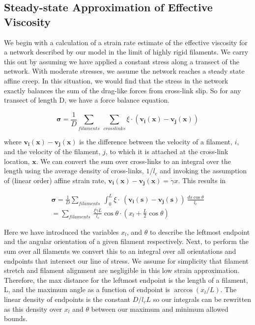 \documentclass[pre,preprint]{revtex4-1}
\begin{document}
\subsection{Steady-state Approximation of Effective Viscosity}
\label{sec:eff_vic}
We begin with a calculation of a strain rate estimate of the effective viscosity for a network described by our model in the limit of highly rigid filaments.  We carry this out by assuming we have applied a constant stress along a transect of the network.  With moderate stresses, we assume the network reaches a steady state affine creep. In this situation, we would find that the stress in the network exactly balances the sum of the drag-like forces from cross-link slip.  So for any transect of length D, we have a force balance equation.

\begin{equation}
\mathbf{\sigma} = \frac{1}{D}\sum_{filaments}\: \sum_{crosslinks}\xi \cdot (\mathbf{v_i(x)}-\mathbf{v_j(x)})
\end{equation}

where $\mathbf{v_i(x)}-\mathbf{v_j(x)}$ is the difference between the velocity of a filament, $i$, and the velocity of the filament, $j$, to which it is attached at the cross-link location, $\mathbf{x}$. We can convert the sum over cross-links to an integral over the length using the average density of cross-links, $1/l_c$ and invoking the assumption of (linear order) affine strain rate, $\mathbf{v_i(x)}-\mathbf{v_j(x)}=\dot \gamma x$. This results in

\begin{multline}
\mathbf{\sigma} =  \frac{1}{D}\sum_{filaments}\:  \int_0^L \xi \cdot  \: (\mathbf{v_i(s)}-\mathbf{v_j(s)}) \:\frac{ds \cos \theta }{l_c} \\
 = \sum_{filaments}\:  \frac{\xi \dot \gamma L}{l_c} \cos \theta \cdot (x_l + \frac{L}{2} \cos \theta)
\end{multline}

Here we have introduced the variables $x_l$, and $\theta$ to describe the leftmost endpoint and the angular orientation of a given filament respectively.  Next, to perform the sum over all filaments we convert this to an integral over all orientations and endpoints that intersect our line of stress. We assume for simplicity that filament stretch and filament alignment are negligible in this low strain approximation.  Therefore, the max distance for the leftmost endpoint is the length of a filament, L, and the maximum angle as a function of endpoint is $\arccos(x_l/L)$.  The linear density of endpoints is the constant $D/l_cL$ so our integrals can be rewritten as this density over $x_l$ and $\theta$ between our maximum and minimum allowed bounds.
\end{document}
